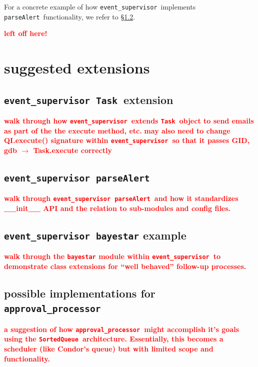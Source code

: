 \documentclass{article}
\newcommand{\FIXME}[1]{\textcolor{red}{\textbf{#1}}}
\newcommand{\parseAlert}{\texttt{parseAlert}~}
\newcommand{\SortedQueue}{\texttt{SortedQueue}~}
\newcommand{\Task}{\texttt{Task}~}
\newcommand{\approvalProcessor}{\texttt{approval\_processor}~}
\newcommand{\eventSupervisor}{\texttt{event\_supervisor}~}
\begin{document}
For a concrete example of how \eventSupervisor implements \parseAlert functionality, we refer to \S\ref{sec: eventSupervisor parseAlert}.


\newpage

\FIXME{left off here!}

\newpage

\section{suggested extensions}
\label{sec: suggested extensions}


\subsection{\eventSupervisor \Task extension}
\label{sec: eventSupervisor Task}

\FIXME{walk through how \eventSupervisor extends \Task object to send emails as part of the the execute method, etc.}
\FIXME{may also need to change QI.execute() signature within \eventSupervisor so that it passes GID, gdb $\rightarrow$ Task.execute correctly}


\subsection{\eventSupervisor \parseAlert}
\label{sec: eventSupervisor parseAlert}

\FIXME{walk through \eventSupervisor \parseAlert and how it standardizes \_\_init\_\_ API and the relation to sub-modules and config files.}


\subsection{\eventSupervisor \texttt{bayestar} example}
\label{sec: eventSupervisor bayestar}

\FIXME{walk through the \texttt{bayestar} module within \eventSupervisor to demonstrate class extensions for ``well behaved'' follow-up processes.}


\subsection{possible implementations for \approvalProcessor}
\label{sec: approvalProcessor}

\FIXME{a suggestion of how \approvalProcessor might accomplish it's goals using the \SortedQueue architecture. Essentially, this becomes a scheduler (like Condor's queue) but with limited scope and functionality.}

\end{document}
